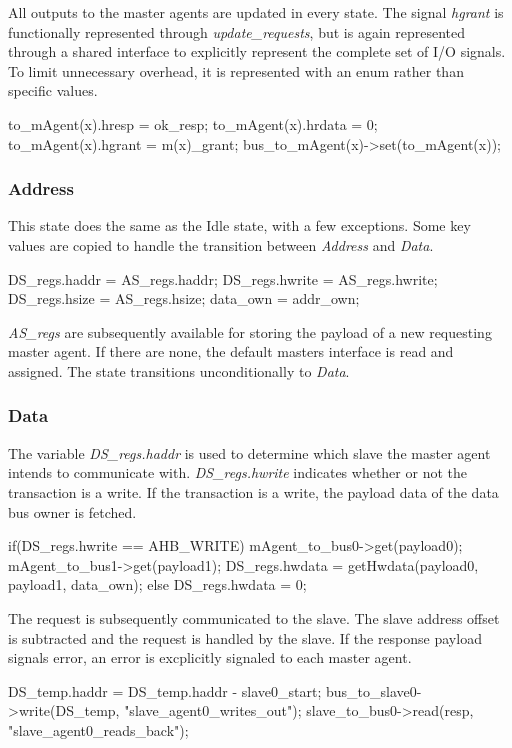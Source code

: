 All outputs to the master agents are updated in every state.
The signal \textit{hgrant} is functionally represented through \textit{update\_requests}, but is again represented through a shared interface to explicitly represent the complete set of I/O signals. To limit unnecessary overhead, it is represented with an enum rather than specific values.  
\begin{C++}
to_mAgent(x).hresp = ok_resp; 
to_mAgent(x).hrdata = 0; 
to_mAgent(x).hgrant = m(x)_grant;
bus_to_mAgent(x)->set(to_mAgent(x)); 
\end{C++}

		
\subsubsection{Address}
This state does the same as the Idle state, with a few exceptions. Some key values are copied to handle the transition between \textit{Address} and \textit{Data}.

\begin{C++}
DS_regs.haddr = AS_regs.haddr; 
DS_regs.hwrite = AS_regs.hwrite; 
DS_regs.hsize = AS_regs.hsize; 
data_own = addr_own;
\end{C++}

\textit{AS\_regs} are subsequently available for storing the payload of a new requesting master agent. If there are none, the default masters interface is read and assigned. The state transitions unconditionally to \textit{Data}.

\subsubsection{Data}
The variable \textit{DS\_regs.haddr} is used to determine which slave the master agent intends to communicate with. \textit{DS\_regs.hwrite} indicates whether or not the transaction is a write. If the transaction is a write, the payload data of the data bus owner is fetched.
\begin{C++}
if(DS_regs.hwrite == AHB_WRITE){
mAgent_to_bus0->get(payload0);
mAgent_to_bus1->get(payload1);
DS_regs.hwdata = getHwdata(payload0, payload1, data_own);
}else{
DS_regs.hwdata = 0;
}
\end{C++}  

The request is subsequently communicated to the slave. The slave address offset is subtracted and the request is handled by the slave. If the response payload signals error, an error is excplicitly signaled to each master agent.
\begin{C++}
DS_temp.haddr = DS_temp.haddr - slave0_start;
bus_to_slave0->write(DS_temp, "slave_agent0_writes_out");
slave_to_bus0->read(resp, "slave_agent0_reads_back");
\end{C++} 

